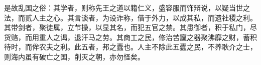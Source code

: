 \begin{abstractzh}
是故乱国之俗：其学者，则称先王之道以籍仁义，盛容服而饰辩说，以疑当世之法，而贰人主之心。其言谈者，为设诈称，借于外力，以成其私，而遗社稷之利。其带剑者，聚徒属，立节操，以显其名，而犯五官之禁。其患御者，积于私门，尽货赂，而用重人之谒，退汗马之劳。其商工之民，修治苦窳之器聚沸靡之财，蓄积待时，而侔农夫之利。此五者，邦之蠹也。人主不除此五蠹之民，不养耿介之士，则海内虽有破亡之国，削灭之朝，亦勿怪矣。
\end{abstractzh}
